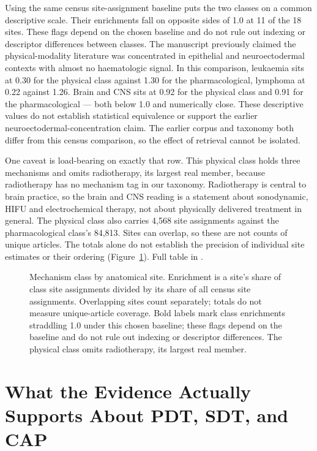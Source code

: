 \documentclass[11pt,twoside,openright]{report}
\begin{document}
Using the same census site-assignment baseline puts the two classes on a common descriptive scale. Their enrichments fall on opposite sides of 1.0 at 11 of the 18 sites. These flags depend on the chosen baseline and do not rule out indexing or descriptor differences between classes. The manuscript previously claimed the physical-modality literature was concentrated in epithelial and neuroectodermal contexts with almost no haematologic signal. In this comparison, leukaemia sits at 0.30 for the physical class against 1.30 for the pharmacological, lymphoma at 0.22 against 1.26. Brain and CNS sits at 0.92 for the physical class and 0.91 for the pharmacological --- both below 1.0 and numerically close. These descriptive values do not establish statistical equivalence or support the earlier neuroectodermal-concentration claim. The earlier corpus and taxonomy both differ from this census comparison, so the effect of retrieval cannot be isolated.

One caveat is load-bearing on exactly that row. This physical class holds three mechanisms and omits radiotherapy, its largest real member, because radiotherapy has no mechanism tag in our taxonomy. Radiotherapy is central to brain practice, so the brain and CNS reading is a statement about sonodynamic, HIFU and electrochemical therapy, not about physically delivered treatment in general. The physical class also carries 4,568 site assignments against the pharmacological class's 84,813. Sites can overlap, so these are not counts of unique articles. The totals alone do not establish the precision of individual site estimates or their ordering (Figure~\ref{fig:fig14c_class_by_site}). Full table in .

\begin{figure}[tbp]
\setcounter{figure}{10}
\caption{Mechanism class by anatomical site. Enrichment is a site's share of class site assignments divided by its share of all census site assignments. Overlapping sites count separately; totals do not measure unique-article coverage. Bold labels mark class enrichments straddling 1.0 under this chosen baseline; these flags depend on the baseline and do not rule out indexing or descriptor differences. The physical class omits radiotherapy, its largest real member.}
\label{fig:fig14c_class_by_site}
\end{figure}

\section{What the Evidence Actually Supports About PDT, SDT, and CAP}
\end{document}

